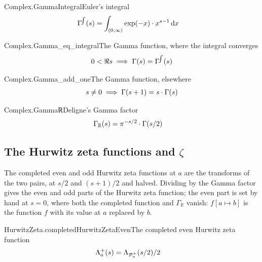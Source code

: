 \documentclass{article}
\begin{document}
\begin{leandefinition}[def, sum=xCZOAYlwQ0]{Complex.GammaIntegral}{Euler's integral}
\label{def:Complex.GammaIntegral}
\[\LeanMath{\begin{aligned}\Gamma^{\!\int}(s) &= \int_{(0, \infty)} \exp(-x) \cdot x^{s - 1} \,\mathrm{d}x\end{aligned}}\]
\end{leandefinition}

\begin{leanfact}[sum=c9zEDWOvsf]{Complex.Gamma_eq_integral}{The Gamma function, where the integral converges}
\label{fact:Complex.Gamma_eq_integral}
\[\LeanMath{0 < \Re s \implies \Gamma(s) = \Gamma^{\!\int}(s)}\]
\end{leanfact}

\begin{leanfact}[sum=pkoPywLsXN]{Complex.Gamma_add_one}{The Gamma function, elsewhere}
\label{fact:Complex.Gamma_add_one}
\[\LeanMath{s \ne 0 \implies \Gamma(s + 1) = s \cdot \Gamma(s)}\]
\end{leanfact}

\begin{leandefinition}[def, sum=0Swt3CYXWl]{Complex.Gammaℝ}{Deligne's Gamma factor}
\label{def:Complex.Gammau211d}
\[\LeanMath{\begin{aligned}\Gamma_{\mathbb{R}}(s) &= \pi^{-s / 2} \cdot \Gamma(s / 2)\end{aligned}}\]
\end{leandefinition}

\subsection{The Hurwitz zeta functions and $\zeta$}

The completed even and odd Hurwitz zeta functions at $a$ are the transforms
of the two pairs, at $s/2$ and $(s+1)/2$ and halved. Dividing by the Gamma
factor gives the even and odd parts of the Hurwitz zeta function; the even
part is set by hand at $s = 0$, where both the completed function and
$\Gamma_{\mathbb{R}}$ vanish: $f[a \mapsto b]$ is the function $f$ with its
value at $a$ replaced by $b$.

\begin{leandefinition}[def, sum=u4Q9nvIfDr]{HurwitzZeta.completedHurwitzZetaEven}{The completed even Hurwitz zeta function}
\label{def:HurwitzZeta.completedHurwitzZetaEven}
\[\LeanMath{\begin{aligned}\Lambda^{+}_{a}(s) &= \Lambda_{\mathcal{P}^{+}_{a}}(s / 2) / 2\end{aligned}}\]
\end{leandefinition}
\end{document}
